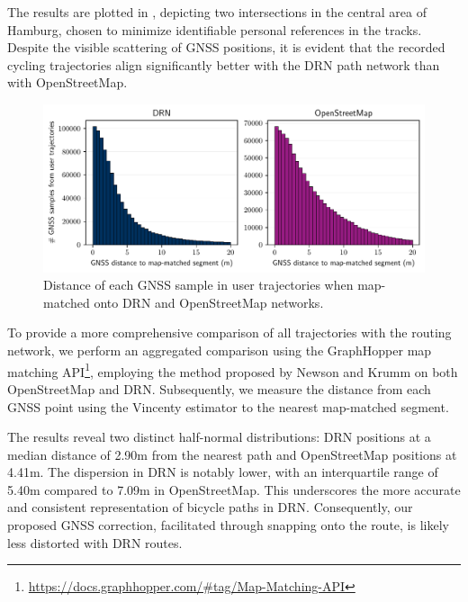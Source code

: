 The results are plotted in , depicting two intersections in the central area of Hamburg, chosen to minimize identifiable personal references in the tracks. Despite the visible scattering of GNSS positions, it is evident that the recorded cycling trajectories align significantly better with the DRN path network than with OpenStreetMap.

\begin{figure}[t]
\centering 
\includegraphics[width=\linewidth]{images/routing-gnss-mapmatching-distribution.pdf}
\caption{Distance of each GNSS sample in user trajectories when map-matched onto DRN and OpenStreetMap networks.}
\label{fig:routing-gnss-mapmatching-distribution}
\end{figure}

To provide a more comprehensive comparison of all trajectories with the routing network, we perform an aggregated comparison using the GraphHopper map matching API\footnote{\url{https://docs.graphhopper.com/\#tag/Map-Matching-API}}, employing the method proposed by Newson and Krumm \cite{newson_hidden_2009} on both OpenStreetMap and DRN. Subsequently, we measure the distance from each GNSS point using the Vincenty estimator to the nearest map-matched segment.

The results reveal two distinct half-normal distributions: DRN positions at a median distance of 2.90m from the nearest path and OpenStreetMap positions at 4.41m. The dispersion in DRN is notably lower, with an interquartile range of 5.40m compared to 7.09m in OpenStreetMap. This underscores the more accurate and consistent representation of bicycle paths in DRN. Consequently, our proposed GNSS correction, facilitated through snapping onto the route, is likely less distorted with DRN routes.

